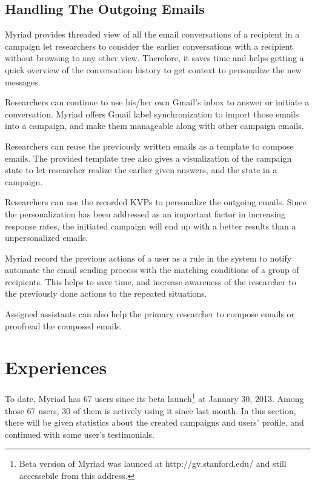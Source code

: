 \subsection{Handling The Outgoing Emails}
\label{subsec:5.4.2:IncoEmai}

Myriad provides threaded view of all the email conversations of a recipient in a campaign let researchers to consider the earlier conversations with a recipient without browsing to any other view. Therefore, it saves time and helps getting a quick overview of the conversation history to get context to personalize the new messages.
\vspace{1cm}

Researchers can continue to use his/her own Gmail's inbox to answer or initiate a conversation. Myriad offers Gmail label synchronization to import those emails into a campaign, and make them manageable along with other campaign emails.
\vspace{1cm}

Researchers can reuse the previously written emails as a template to compose emails. The provided template tree also gives a visualization of the campaign state to let researcher realize the earlier given answers, and the state in a campaign.
\vspace{1cm}

Researchers can use the recorded \ac{KVP}s to personalize the outgoing emails. Since the personalization has been addressed as an important factor in increasing response rates, the initiated campaign will end up with a better results than a unpersonalized emails.
\vspace{1cm}

Myriad record the previous actions of a user as a rule in the system to notify automate the email sending process with the matching conditions of a group of recipients. This helps to save time, and increase awareness of the researcher to the previously done actions to the repeated situations.
\vspace{1cm}

Assigned assistants can also help the primary researcher to compose emails or proofread the composed emails.


\section{Experiences}
\label{sec:5.5:Expr}

To date, Myriad has 67 users since its beta launch\footnote{Beta version of Myriad was launced at http://gv.stanford.edu/ and still accessebile from this address.} at January 30, 2013. Among those 67 users, 30 of them is actively using it since last month. In this section, there will be given statistics about the created campaigns and users' profile, and continued with some user's testimonials.

